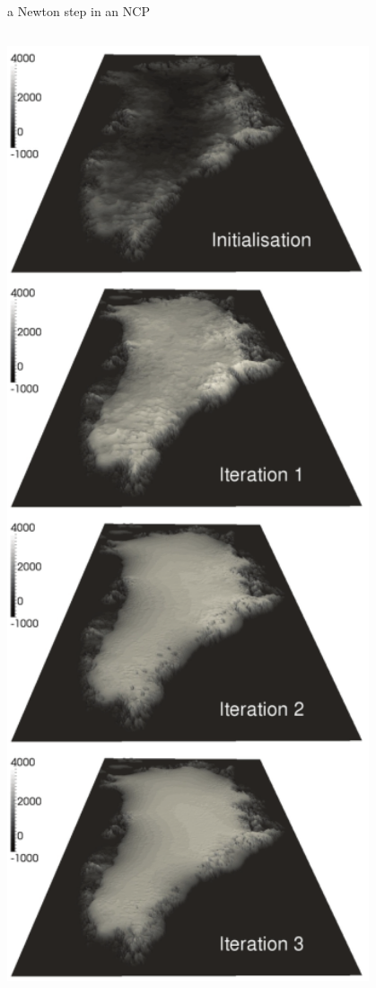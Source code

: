 \documentclass[10pt,hyperref,dvipsnames]{beamer}
\begin{document}
\begin{frame}{a Newton step in an NCP}
\begin{columns}
\begin{column}{0.3\textwidth}
\hfill \includegraphics[width=0.8\textwidth]{figs/GISsequence.png} \hfill
\end{column}
\end{columns}
\end{frame}
\end{document}

